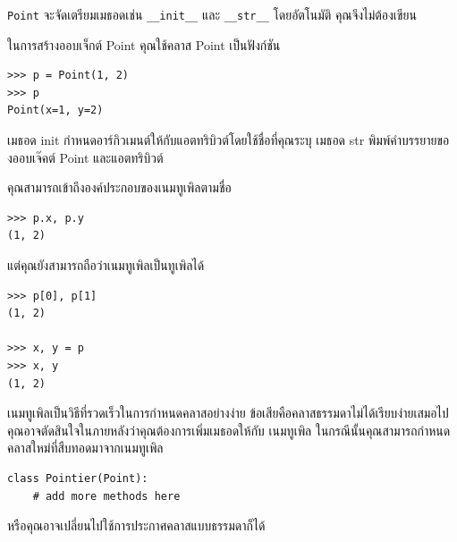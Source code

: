 
{\tt Point} จะจัดเตรียมเมธอดเช่น \verb"__init__" และ \verb"__str__" โดยอัตโนมัติ คุณจึงไม่ต้องเขียน

ในการสร้างออบเจ็กต์ Point คุณใช้คลาส Point เป็นฟังก์ชัน

\begin{verbatim}
>>> p = Point(1, 2)
>>> p
Point(x=1, y=2)
\end{verbatim}

เมธอด init กำหนดอาร์กิวเมนต์ให้กับแอตทริบิวต์โดยใช้ชื่อที่คุณระบุ เมธอด str พิมพ์คำบรรยายของออบเจ๊คต์ Point และแอตทริบิวต์

คุณสามารถเข้าถึงองค์ประกอบของเนมทูเพิลตามชื่อ

\begin{verbatim}
>>> p.x, p.y
(1, 2)
\end{verbatim}

แต่คุณยังสามารถถือว่าเนมทูเพิลเป็นทูเพิลได้

\begin{verbatim}
>>> p[0], p[1]
(1, 2)

>>> x, y = p
>>> x, y
(1, 2)
\end{verbatim}

เนมทูเพิลเป็นวิธีที่รวดเร็วในการกำหนดคลาสอย่างง่าย ข้อเสียคือคลาสธรรมดาไม่ได้เรียบง่ายเสมอไป 
คุณอาจตัดสินใจในภายหลังว่าคุณต้องการเพิ่มเมธอดให้กับ เนมทูเพิล ในกรณีนั้นคุณสามารถกำหนดคลาสใหม่ที่สืบทอดมาจากเนมทูเพิล


\begin{verbatim}
class Pointier(Point):
    # add more methods here
\end{verbatim}

หรือคุณอาจเปลี่ยนไปใช้การประกาศคลาสแบบธรรมดาก็ได้

